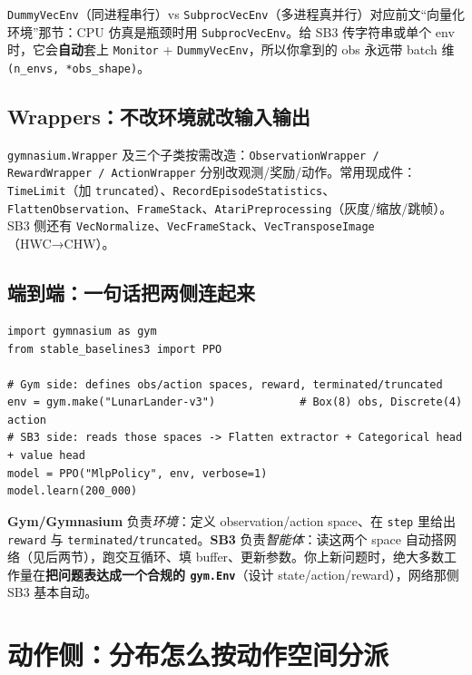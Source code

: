 \documentclass[11pt,a4paper]{article}
\begin{document}
\begin{tiebox}
\texttt{DummyVecEnv}（同进程串行）vs \texttt{SubprocVecEnv}（多进程真并行）对应前文“向量化环境”那节：CPU 仿真是瓶颈时用 \texttt{SubprocVecEnv}。给 SB3 传字符串或单个 env 时，它会\textbf{自动}套上 \texttt{Monitor} + \texttt{DummyVecEnv}，所以你拿到的 obs 永远带 batch 维 \texttt{(n\_envs, *obs\_shape)}。
\end{tiebox}

\subsection{Wrappers：不改环境就改输入输出}

\texttt{gymnasium.Wrapper} 及三个子类按需改造：\texttt{ObservationWrapper / RewardWrapper / ActionWrapper} 分别改观测/奖励/动作。常用现成件：\texttt{TimeLimit}（加 \texttt{truncated}）、\texttt{RecordEpisodeStatistics}、\texttt{FlattenObservation}、\texttt{FrameStack}、\texttt{AtariPreprocessing}（灰度/缩放/跳帧）。SB3 侧还有 \texttt{VecNormalize}、\texttt{VecFrameStack}、\texttt{VecTransposeImage}（HWC→CHW）。

\subsection{端到端：一句话把两侧连起来}

\begin{lstlisting}
import gymnasium as gym
from stable_baselines3 import PPO

# Gym side: defines obs/action spaces, reward, terminated/truncated
env = gym.make("LunarLander-v3")             # Box(8) obs, Discrete(4) action
# SB3 side: reads those spaces -> Flatten extractor + Categorical head + value head
model = PPO("MlpPolicy", env, verbose=1)
model.learn(200_000)
\end{lstlisting}

\begin{keybox}[两侧分工]
\textbf{Gym/Gymnasium} 负责\emph{环境}：定义 observation/action space、在 \texttt{step} 里给出 \texttt{reward} 与 \texttt{terminated/truncated}。\textbf{SB3} 负责\emph{智能体}：读这两个 space 自动搭网络（见后两节），跑交互循环、填 buffer、更新参数。你上新问题时，绝大多数工作量在\textbf{把问题表达成一个合规的 \texttt{gym.Env}}（设计 state/action/reward），网络那侧 SB3 基本自动。
\end{keybox}

\section{动作侧：分布怎么按动作空间分派}
\end{document}
